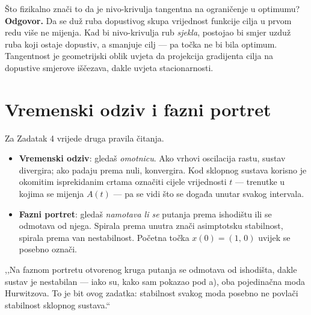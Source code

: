 \begin{pitanje}{Što fizikalno znači to da je nivo-krivulja tangentna na ograničenje u optimumu?}
\textbf{Odgovor.} Da se duž ruba dopustivog skupa vrijednost funkcije cilja u
prvom redu više ne mijenja. Kad bi nivo-krivulja rub \emph{sjekla}, postojao bi
smjer uzduž ruba koji ostaje dopustiv, a smanjuje cilj --- pa točka ne bi bila
optimum. Tangentnost je geometrijski oblik uvjeta da projekcija gradijenta cilja
na dopustive smjerove iščezava, dakle uvjeta stacionarnosti.
\end{pitanje}

\section{Vremenski odziv i fazni portret}
\label{sec:odziv-fazni}

Za Zadatak 4 vrijede druga pravila čitanja.

\begin{itemize}[leftmargin=*]
  \item \textbf{Vremenski odziv}: gledaš \emph{omotnicu}. Ako vrhovi oscilacija
        rastu, sustav divergira; ako padaju prema nuli, konvergira. Kod sklopnog
        sustava korisno je okomitim isprekidanim crtama označiti cijele
        vrijednosti $t$ --- trenutke u kojima se mijenja $A(t)$ --- pa se vidi
        što se događa unutar svakog intervala.
  \item \textbf{Fazni portret}: gledaš \emph{namotava li se} putanja prema
        ishodištu ili se odmotava od njega. Spirala prema unutra znači
        asimptotsku stabilnost, spirala prema van nestabilnost. Početna točka
        $x(0) = (1,\,0)$ uvijek se posebno označi.
\end{itemize}

\begin{izgovor}
,,Na faznom portretu otvorenog kruga putanja se odmotava od ishodišta, dakle
sustav je nestabilan --- iako su, kako sam pokazao pod a), oba pojedinačna moda
Hurwitzova. To je bit ovog zadatka: stabilnost svakog moda posebno ne povlači
stabilnost sklopnog sustava.``
\end{izgovor}
